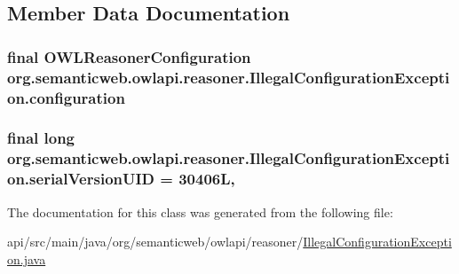 \subsection{Member Data Documentation}
\hypertarget{classorg_1_1semanticweb_1_1owlapi_1_1reasoner_1_1_illegal_configuration_exception_a9dbe5770f4907b41a49c62112c89ad4b}{
\subsubsection[{configuration}]{\setlength{\rightskip}{0pt plus 5cm}final {\bf O\-W\-L\-Reasoner\-Configuration} org.\-semanticweb.\-owlapi.\-reasoner.\-Illegal\-Configuration\-Exception.\-configuration\hspace{0.3cm}{\ttfamily [private]}}}\label{classorg_1_1semanticweb_1_1owlapi_1_1reasoner_1_1_illegal_configuration_exception_a9dbe5770f4907b41a49c62112c89ad4b}
\hypertarget{classorg_1_1semanticweb_1_1owlapi_1_1reasoner_1_1_illegal_configuration_exception_a7d0fc720480d6768f9007c9412c4e7fc}{
\subsubsection[{serial\-Version\-U\-I\-D}]{\setlength{\rightskip}{0pt plus 5cm}final long org.\-semanticweb.\-owlapi.\-reasoner.\-Illegal\-Configuration\-Exception.\-serial\-Version\-U\-I\-D = 30406\-L\hspace{0.3cm}{\ttfamily [static]}, {\ttfamily [private]}}}\label{classorg_1_1semanticweb_1_1owlapi_1_1reasoner_1_1_illegal_configuration_exception_a7d0fc720480d6768f9007c9412c4e7fc}


The documentation for this class was generated from the following file\-:\begin{DoxyCompactItemize}
\item 
api/src/main/java/org/semanticweb/owlapi/reasoner/\hyperlink{_illegal_configuration_exception_8java}{Illegal\-Configuration\-Exception.\-java}\end{DoxyCompactItemize}

